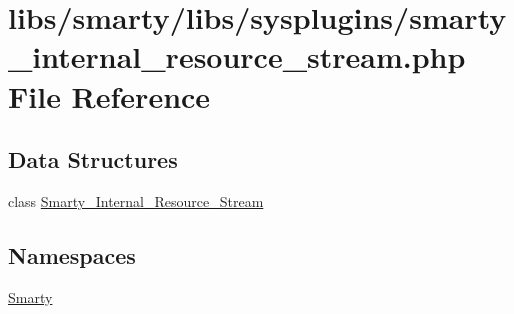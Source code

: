 \hypertarget{smarty__internal__resource__stream_8php}{}\section{libs/smarty/libs/sysplugins/smarty\+\_\+internal\+\_\+resource\+\_\+stream.php File Reference}
\label{smarty__internal__resource__stream_8php}
\subsection*{Data Structures}
\begin{DoxyCompactItemize}
\item 
class \hyperlink{class_smarty___internal___resource___stream}{Smarty\+\_\+\+Internal\+\_\+\+Resource\+\_\+\+Stream}
\end{DoxyCompactItemize}
\subsection*{Namespaces}
\begin{DoxyCompactItemize}
\item 
 \hyperlink{namespace_smarty}{Smarty}
\end{DoxyCompactItemize}
